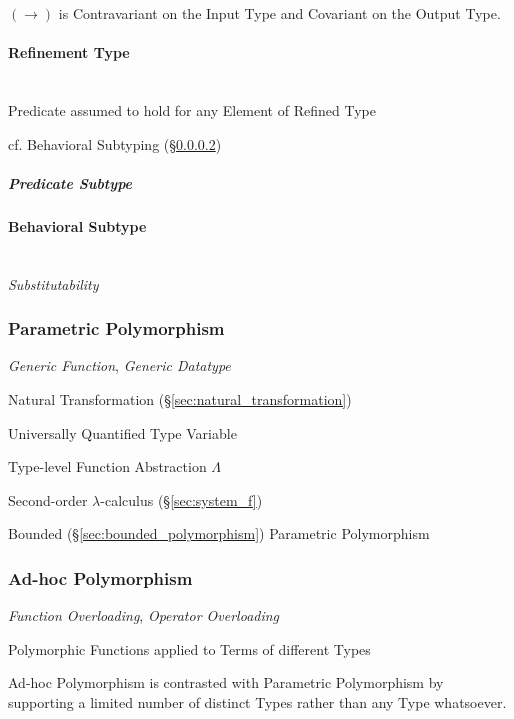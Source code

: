 $(\rightarrow)$ is Contravariant on the Input Type and Covariant on
the Output Type.



\paragraph{Refinement Type}\label{sec:refinement_type}
\hfill \\

Predicate assumed to hold for any Element of Refined Type

cf. Behavioral Subtyping (\S\ref{sec:behavioral_subtype})


\subparagraph{Predicate Subtype}\label{sec:predicate_subtype}



\paragraph{Behavioral Subtype}\label{sec:behavioral_subtype}
\hfill \\

\emph{Substitutability}



\subsubsection{Parametric Polymorphism}
\label{sec:parametric_polymorphism}

\emph{Generic Function}, \emph{Generic Datatype}

Natural Transformation (\S\ref{sec:natural_transformation})

Universally Quantified Type Variable

Type-level Function Abstraction $\Lambda$

Second-order $\lambda$-calculus (\S\ref{sec:system_f})

Bounded (\S\ref{sec:bounded_polymorphism}) Parametric Polymorphism



\subsubsection{Ad-hoc Polymorphism}\label{sec:adhoc_polymorphism}

\emph{Function Overloading}, \emph{Operator Overloading}

Polymorphic Functions applied to Terms of different Types

Ad-hoc Polymorphism is contrasted with Parametric Polymorphism by
supporting a limited number of distinct Types rather than any Type
whatsoever.



